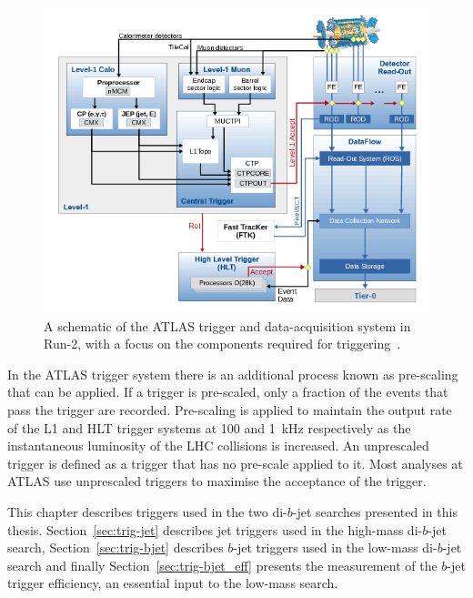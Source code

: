 \begin{figure}[!htb]
  \begin{center}
    \includegraphics[width=0.75\linewidth, angle=0]{figs/Detector/trigger_schem.png}
  \end{center}
  \vspace{-1em}
  \caption[A schematic of the ATLAS trigger and data-acquisition system in Run-2, with a focus on the components required for triggering.]
          {A schematic of the ATLAS trigger and data-acquisition system in Run-2, with a focus on the components required for triggering~\cite{det-run2_triggerPerf}.}
  \label{fig:det-trigger_schem}
\end{figure}

In the ATLAS trigger system there is an additional process known as pre-scaling that can be applied.
If a trigger is pre-scaled, only a fraction of the events that pass the trigger are recorded.
Pre-scaling is applied to maintain the output rate of the L1 and HLT trigger systems at 100 and 1~kHz respectively as the instantaneous luminosity of the LHC collisions is increased.
An unprescaled trigger is defined as a trigger that has no pre-scale applied to it.
Most analyses at ATLAS use unprescaled triggers to maximise the acceptance of the trigger.

This chapter describes triggers used in the two di-$b$-jet searches presented in this thesis.
Section~\ref{sec:trig-jet} describes jet triggers used in the high-mass di-$b$-jet search,
Section~\ref{sec:trig-bjet} describes $b$-jet triggers  used in the low-mass di-$b$-jet search
and finally Section~\ref{sec:trig-bjet_eff} presents the measurement of the $b$-jet trigger efficiency, an essential input to the low-mass search.

